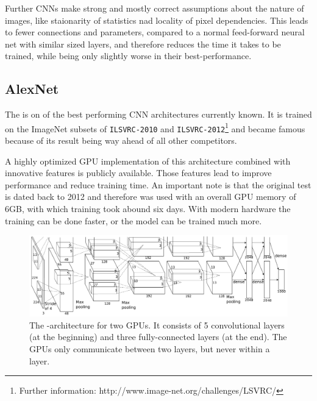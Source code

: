 Further CNNs make strong and mostly correct assumptions about the nature of images, like staionarity of statistics nad locality of pixel dependencies. This leads to fewer connections and parameters, compared to a normal feed-forward neural net with similar sized layers, and therefore reduces the time it takes to be trained, while being only slightly worse in their best-performance. \cite{krizhevsky2012imagenet}


\subsection{AlexNet} \label{subsec: AlexNet}

The \textit{\alexnet} is on of the best performing CNN architectures currently known. It is trained on the ImageNet subsets of \texttt{ILSVRC-2010} and \texttt{ILSVRC-2012}\footnote{Further information: http://www.image-net.org/challenges/LSVRC/} and became famous because of its result being way ahead of all other competitors.

A highly optimized GPU implementation of this architecture combined with innovative features is publicly available. Those features lead to improve performance and reduce training time.
An important note is that the original test is dated back to 2012 and therefore was used with an overall GPU memory of 6GB, with which training took abound six days. With modern hardware the training can be done faster, or the model can be trained much more. \cite{krizhevsky2012imagenet}


\begin{figure}[ht]
	\includegraphics[scale = 0.5]{src/pic/AlexNet-structure.PNG}
	\caption{The \alexnet-architecture for two GPUs. It consists of 5 convolutional layers (at the beginning) and three fully-connected layers (at the end). The GPUs only communicate between two layers, but never within a layer.\cite{krizhevsky2012imagenet}}
	\label{pic: AlexNet}
\end{figure}

